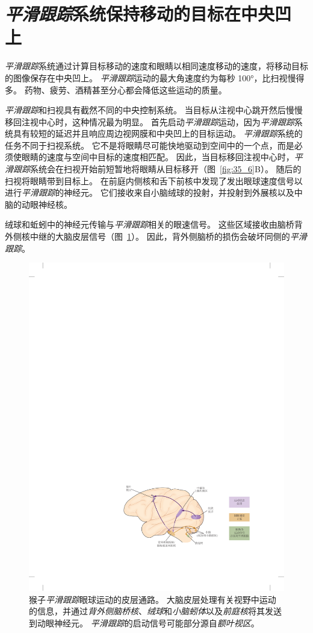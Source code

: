 \section{\textit{平滑跟踪}系统保持移动的目标在中央凹上}

\textit{平滑跟踪}系统通过计算目标移动的速度和眼睛以相同速度移动的速度，将移动目标的图像保存在中央凹上。
\textit{平滑跟踪}运动的最大角速度约为每秒 100°，比扫视慢得多。
药物、疲劳、酒精甚至分心都会降低这些运动的质量。


\textit{平滑跟踪}和扫视具有截然不同的中央控制系统。
当目标从注视中心跳开然后慢慢移回注视中心时，这种情况最为明显。
首先启动\textit{平滑跟踪}运动，因为\textit{平滑跟踪}系统具有较短的延迟并且响应周边视网膜和中央凹上的目标运动。
\textit{平滑跟踪}系统的任务不同于扫视系统。
它不是将眼睛尽可能快地驱动到空间中的一个点，而是必须使眼睛的速度与空间中目标的速度相匹配。
因此，当目标移回注视中心时，\textit{平滑跟踪}系统会在扫视开始前短暂地将眼睛从目标移开（图~\ref{fig:35_6}B）。
随后的扫视将眼睛带到目标上。
在前庭内侧核和舌下前核中发现了发出眼球速度信号以进行\textit{平滑跟踪}的神经元。
它们接收来自小脑绒球的投射，并投射到外展核以及中脑的动眼神经核。


绒球和蚯蚓中的神经元传输与\textit{平滑跟踪}相关的眼速信号。 
这些区域接收由脑桥背外侧核中继的大脑皮层信号（图~\ref{fig:35_15}）。
因此，背外侧脑桥的损伤会破坏同侧的\textit{平滑跟踪}。


\begin{figure}[htbp]
	\centering
	\includegraphics[width=0.87\linewidth]{chap35/fig_35_15}
	\caption{猴子\textit{平滑跟踪}眼球运动的皮层通路。
		大脑皮层处理有关视野中运动的信息，并通过\textit{背外侧脑桥核}、\textit{绒球}和\textit{小脑蚓体}以及\textit{前庭核}将其发送到动眼神经元。
		\textit{平滑跟踪}的启动信号可能部分源自\textit{额叶视区}。}
	\label{fig:35_15}
\end{figure}


